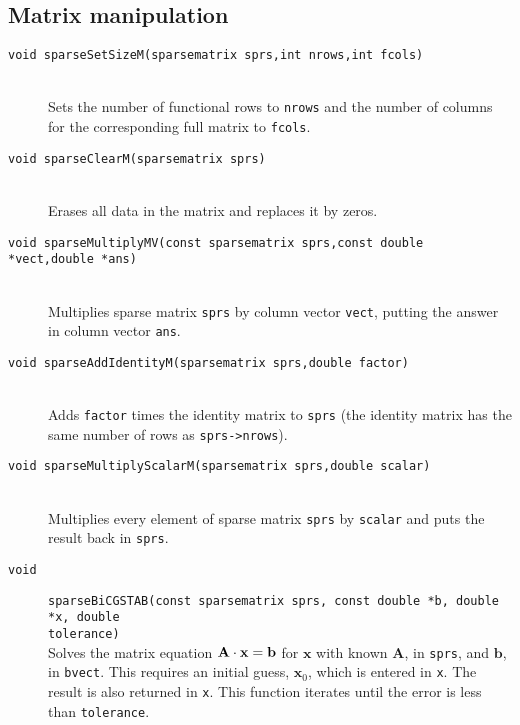 \documentclass[11pt]{article}
\newcommand {\ttt} {\texttt}
\begin{document}
\subsection{Matrix manipulation}

\begin{description}

\item[\ttt{void sparseSetSizeM(sparsematrix sprs,int nrows,int fcols)}]
\hfill \\
Sets the number of functional rows to \ttt{nrows} and the number of columns for the corresponding full matrix to \ttt{fcols}.

\item[\ttt{void sparseClearM(sparsematrix sprs)}]
\hfill \\
Erases all data in the matrix and replaces it by zeros.


\item[\ttt{void sparseMultiplyMV(const sparsematrix sprs,const double *vect,double *ans)}]
\hfill \\
Multiplies sparse matrix \ttt{sprs} by column vector \ttt{vect}, putting the answer in column vector \ttt{ans}.

\item[\ttt{void sparseAddIdentityM(sparsematrix sprs,double factor)}]
\hfill \\
Adds \ttt{factor} times the identity matrix to \ttt{sprs} (the identity matrix has the same number of rows as \ttt{sprs->nrows}).

\item[\ttt{void sparseMultiplyScalarM(sparsematrix sprs,double scalar)}]
\hfill \\
Multiplies every element of sparse matrix \ttt{sprs} by \ttt{scalar} and puts the result back in \ttt{sprs}.

\item[\ttt{void}]
\ttt{sparseBiCGSTAB(const sparsematrix sprs, const double *b, double *x, double \\ tolerance)}
\hfill \\
Solves the matrix equation $\bf{A}\cdot \bm{x} = \bm{b}$ for $\bm{x}$ with known $\bm{A}$, in \ttt{sprs}, and $\bm{b}$, in \ttt{bvect}. This requires an initial guess, $\bm{x}_0$, which is entered in \ttt{x}. The result is also returned in \ttt{x}. This function iterates until the error is less than \ttt{tolerance}.


\end{description}
\end{document}
